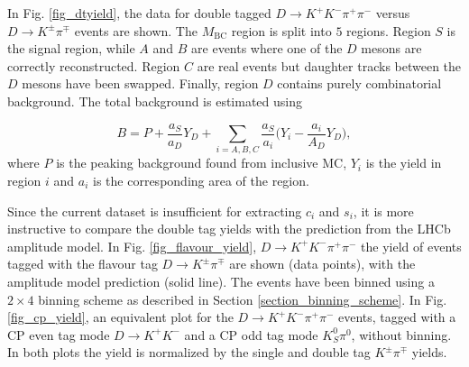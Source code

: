 \documentclass[12pt, a4paper, notitlepage, onecolumn]{article}
\numberwithin{equation}{section}
\begin{document}
In Fig. \ref{fig_dtyield}, the data for double tagged $D\to K^+K^-\pi^+\pi^-$ versus $D\to K^\pm\pi^\mp$ events are shown. The $M_\text{BC}$ region is split into $5$ regions. Region $S$ is the signal region, while $A$ and $B$ are events where one of the $D$ mesons are correctly reconstructed. Region $C$ are real events but daughter tracks between the $D$ mesons have been swapped. Finally, region $D$ contains purely combinatorial background. The total background is estimated using

\begin{equation*}
  B = P + \frac{a_S}{a_D}Y_D + \sum_{i = A, B, C}\frac{a_S}{a_i}\Big(Y_i - \frac{a_i}{A_D}Y_D\Big),
\end{equation*}
where $P$ is the peaking background found from inclusive MC, $Y_i$ is the yield in region $i$ and $a_i$ is the corresponding area of the region.

Since the current dataset is insufficient for extracting $c_i$ and $s_i$, it is more instructive to compare the double tag yields with the prediction from the LHCb amplitude model. In Fig. \ref{fig_flavour_yield}, $D\to K^+K^-\pi^+\pi^-$ the yield of events tagged with the flavour tag $D\to K^\pm\pi^\mp$ are shown (data points), with the amplitude model prediction (solid line). The events have been binned using a $2\times 4$ binning scheme as described in Section \ref{section_binning_scheme}. In Fig. \ref{fig_cp_yield}, an equivalent plot for the $D\to K^+K^-\pi^+\pi^-$ events, tagged with a CP even tag mode $D\to K^+K^-$ and a CP odd tag mode $K_S^0\pi^0$, without binning. In both plots the yield is normalized by the single and double tag $K^\pm\pi^\mp$ yields.
\end{document}
